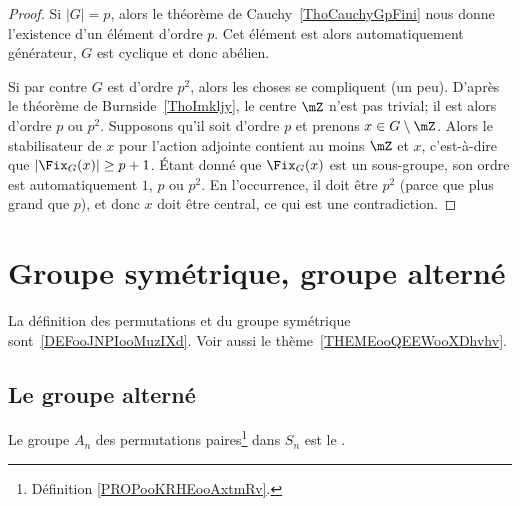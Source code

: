 \begin{proof}
	Si \( | G |=p\), alors le théorème de Cauchy~\ref{ThoCauchyGpFini} nous donne l'existence d'un élément d'ordre \( p\). Cet élément est alors automatiquement générateur, \( G\) est cyclique et donc abélien.

	Si par contre \( G\) est d'ordre \( p^2\), alors les choses se compliquent (un peu). D'après le théorème de Burnside~\ref{ThoImkljy}, le centre \( \mZ\) n'est pas trivial; il est alors d'ordre \( p\) ou \( p^2\). Supposons qu'il soit d'ordre \( p\) et prenons \( x\in G\setminus\mZ\). Alors le stabilisateur de \( x\) pour l'action adjointe contient au moins \( \mZ\) et \( x\), c'est-à-dire que \( |\Fix_G(x)|\geq p+1\). Étant donné que \( \Fix_G(x)\) est un sous-groupe, son ordre est automatiquement \( 1\), \( p\) ou \( p^2\). En l'occurrence, il doit être \( p^2\) (parce que plus grand que \( p\)), et donc \( x\) doit être central, ce qui est une contradiction.
\end{proof}

\section{Groupe symétrique, groupe alterné}
\label{SECooZFYQooFfopMa}

La définition des permutations et du groupe symétrique sont~\ref{DEFooJNPIooMuzIXd}. Voir aussi le thème~\ref{THEMEooQEEWooXDhvhv}.

\subsection{Le groupe alterné}

\begin{definition}      \label{DEFooEIVIooFvVkHH}
	Le groupe \( A_n\) des permutations paires\footnote{Définition \ref{PROPooKRHEooAxtmRv}.} dans \( S_n\) est le .
\end{definition}

